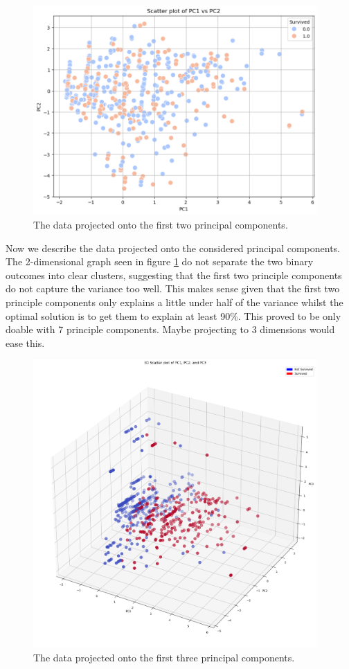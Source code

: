 \documentclass[twoside,11pt]{article}
\begin{document}
\begin{figure}[h!] 
	\centering
	\includegraphics[height=8cm]{analysis_files/analysis_13_2.png}
	\caption{The data projected onto the first two principal components.}
	\label{figure:two-components}
\end{figure}

Now we describe the data projected onto the considered principal components. The 2-dimensional graph seen in figure \ref{figure:two-components} do not separate the two binary outcomes into clear clusters, suggesting that the first two principle components do not capture the variance too well. This makes sense given that the first two principle components only explains a little under half of the variance whilst the optimal solution is to get them to explain at least 90\%. This proved to be only doable with 7 principle components. Maybe projecting to 3 dimensions would ease this.

\begin{figure}[h!]
	\centering
	\includegraphics[height=11cm]{analysis_files/analysis_15_0.png}
	\caption{The data projected onto the first three principal components.}
	\label{figure:three-components}
\end{figure}
    
\end{document}
